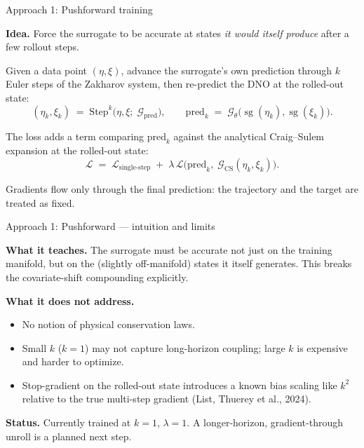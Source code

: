 \documentclass[aspectratio=169,11pt]{beamer}
\newcommand{\Gop}{\mathcal{G}}
\newcommand{\sgrad}{\operatorname{sg}}
\begin{document}
\begin{frame}{Approach 1: Pushforward training}

\textbf{Idea.}
Force the surrogate to be accurate at states \emph{it would itself
produce} after a few rollout steps.

\medskip

Given a data point $(\eta,\xi)$, advance the surrogate's own
prediction through $k$ Euler steps of the Zakharov system, then
re-predict the DNO at the rolled-out state:
\[
  (\eta_k,\xi_k) \;=\; \mathrm{Step}^k\bigl(\eta,\xi;\;
  \Gop_{\text{pred}}\bigr),
  \qquad
  \mathrm{pred}_k \;=\; \Gop_\theta\!\bigl(\sgrad(\eta_k),\sgrad(\xi_k)\bigr).
\]

The loss adds a term comparing $\mathrm{pred}_k$ against the analytical
Craig--Sulem expansion at the rolled-out state:
\[
  \mathcal{L} \;=\; \mathcal{L}_{\text{single-step}}
  \;+\; \lambda\,\mathcal{L}\!\bigl(\mathrm{pred}_k,\;
       \Gop_{\text{CS}}(\eta_k,\xi_k)\bigr).
\]

Gradients flow only through the final prediction: the trajectory and
the target are treated as fixed.

\end{frame}

\begin{frame}{Approach 1: Pushforward --- intuition and limits}

\textbf{What it teaches.} The surrogate must be accurate not just on
the training manifold, but on the (slightly off-manifold) states it
itself generates. This breaks the covariate-shift compounding
explicitly.

\medskip

\textbf{What it does not address.}
\begin{itemize}
  \item No notion of physical conservation laws.
  \item Small $k$ ($k{=}1$) may not capture long-horizon coupling;
        large $k$ is expensive and harder to optimize.
  \item Stop-gradient on the rolled-out state introduces a known bias
        scaling like $k^2$ relative to the true multi-step gradient
        (List, Thuerey et al., 2024).
\end{itemize}

\pause
\medskip

\textbf{Status.} Currently trained at $k{=}1$, $\lambda{=}1$. A
longer-horizon, gradient-through unroll is a planned next step.
\end{frame}
\end{document}
